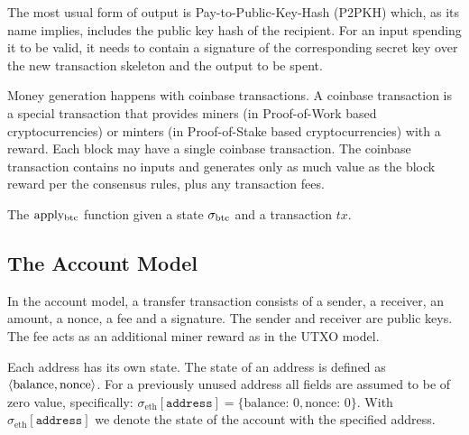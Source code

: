The most usual form of output is Pay-to-Public-Key-Hash (P2PKH) which, as its name implies, includes the public key hash of the recipient. For an input spending it to be valid, it needs to contain a signature of the corresponding secret key over the new transaction skeleton and the output to be spent.

Money generation happens with coinbase transactions. A coinbase transaction is a special transaction that provides miners (in Proof-of-Work based cryptocurrencies) or minters (in Proof-of-Stake based cryptocurrencies) with a reward. Each block may have a single coinbase transaction. The coinbase transaction contains no inputs and generates only as much value as the block reward per the consensus rules, plus any transaction fees.

\begin{algorithm}[H]
    \caption{\label{alg.btcapply} The $\text{apply}\textsubscript{btc}$ function given a state $\btcstate$ and a transaction $tx$.}
    \begin{algorithmic}[1]
            \EndFor
            \EndFor
            \State\Return{$\btcstate$}
        \EndFunction
    \end{algorithmic}
\end{algorithm}

\subsection{The Account Model}
In the account model, a transfer transaction consists of a sender, a receiver, an amount, a nonce, a fee and a signature. The sender and receiver are public keys. The fee acts as an additional miner reward as in the UTXO model.

\def\state{\text{state}}
\def\chain{\ensuremath{\mathcal{C}}}
\def\sender{\texttt{sender}}
\def\receiver{\texttt{receiver}}
\def\amount{\texttt{amount}}
\def\fee{\texttt{fee}}
\def\nonce{\text{nonce}}
\def\bal{\text{balance}}
\def\ethstate{\ensuremath{\sigma_\text{eth}}}
Each address has its own state. The state of an address is defined as $\tpl{\bal, \nonce}$. For a previously unused address all fields are assumed to be of zero value, specifically: $\ethstate[\texttt{address}] = \{\bal{:}\,0, \nonce{:}\,0\}$. With $\ethstate[\texttt{address}]$ we denote the state of the account with the specified address.

